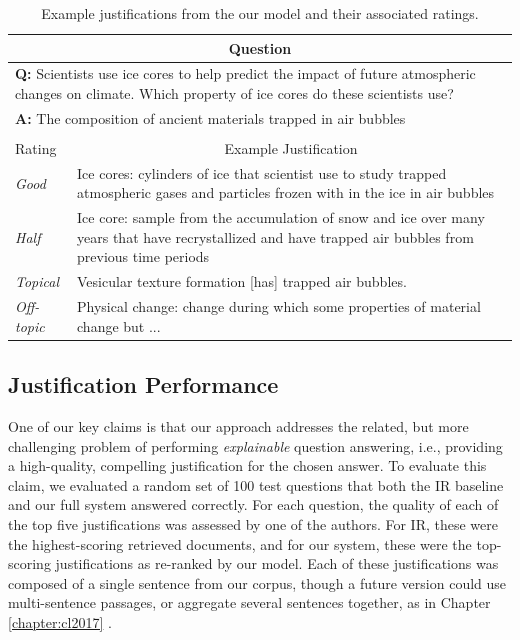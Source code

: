 %
%
\begin{table}[t]
\begin{center}
\begin{tabularx}{\linewidth}{p{2cm}p{12cm}}
\hline
\multicolumn{2}{c}{Question} \\
\hline			
\multicolumn{2}{p{14cm}}{\textbf{Q:} Scientists use ice cores to help predict the impact of future atmospheric changes on climate. Which property of ice cores do these scientists use? } \\
\multicolumn{2}{p{15cm}}{\textbf{A:} The composition of ancient materials trapped in air bubbles} \\
\multicolumn{1}{c}{} & \multicolumn{1}{c}{} \\				
\hline
\multicolumn{1}{l}{Rating} & \multicolumn{1}{c}{Example Justification} \\
\hline			
{\em Good }		&	Ice cores: cylinders of ice that scientist use to study trapped atmospheric gases and particles frozen with in the ice in air bubbles \\
{\em Half }		&	Ice core: sample from the accumulation of snow and ice over many years that have recrystallized and have	trapped air bubbles from previous time periods \\
{\em Topical }	&   Vesicular texture formation [has] trapped air bubbles. \\
{\em Off-topic }	&	Physical change: change during which some properties of material change but ... \\
\end{tabularx}
\caption{{  Example justifications from the our model and their associated ratings. }} 
\label{tab:justification_examples}
\end{center}
\end{table}

\subsection{Justification Performance}
\label{sec-emnlp2017:justification_results}
One of our key claims is that our approach addresses the related, but more challenging problem of performing \emph{explainable} question answering, i.e., providing a high-quality, compelling justification for the chosen answer.  To evaluate this claim, we evaluated a random set of 100 test questions that both the IR baseline and our full system answered correctly.  For each question, the quality of each of the top five justifications was assessed by one of the authors.  For IR, these were the highest-scoring retrieved documents, and for our system, these were the top-scoring justifications as re-ranked by our model.  
Each of these justifications was composed of a single sentence from our corpus, though a future version could use multi-sentence passages, or aggregate several sentences together, as in Chapter \ref{chapter:cl2017} \citep{jansen2017framing}.

